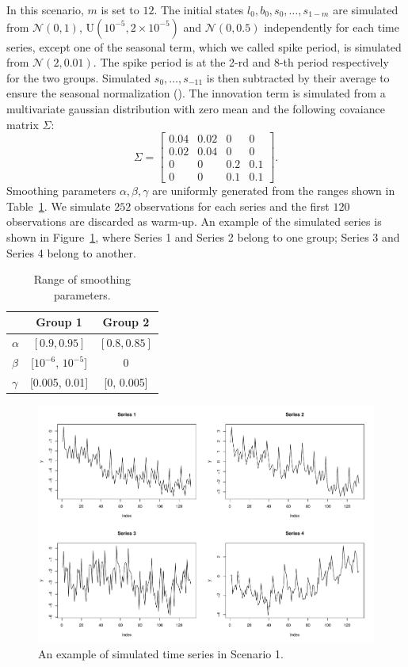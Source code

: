 \documentclass[11pt,a4paper]{article}
\begin{document}
In this scenario, $m$ is set to $12$. The initial states $l_0, b_0, s_0, \dots, s_{1-m}$ are simulated from $\mathcal{N}(0, 1)$, $\text{U}(10^{-5}, 2\times 10^{-5})$ and $\mathcal{N}(0, 0.5)$ independently for each time series, except one of the seasonal term, which we called spike period, is simulated from $\mathcal{N}(2, 0.01)$. 
The spike period is at the 2-rd and 8-th period respectively for the two groups.  Simulated $s_0,\dots,s_{-11}$ is then subtracted by their average to ensure the seasonal normalization (). 
The innovation term is simulated from a multivariate gaussian distribution with zero mean and the following covaiance matrix $\Sigma$:
\[
\Sigma = \left[\begin{matrix}
    0.04 & 0.02 & 0 & 0 \\
    0.02 & 0.04 & 0 & 0 \\
    0 & 0 & 0.2 & 0.1  \\
    0 & 0 & 0.1 & 0.1 
\end{matrix}\right].
\]
Smoothing parameters $\alpha, \beta, \gamma$ are uniformly generated from the ranges shown in Table~\ref{tab:sim1_range}.
We simulate $252$ observations for each series and the first $120$ observations are discarded as warm-up.
An example of the simulated series is shown in Figure~\ref{fig:sim1_example}, where Series 1 and Series 2 belong to one group; Series 3 and Series 4 belong to another.

\begin{table}[h]
\centering
\caption{\label{tab:sim1_range}Range of smoothing parameters.}
\begin{tabular}{lcc}
    \toprule
    & Group 1 & Group 2 \\
    \midrule
$\alpha$ & $[0.9, 0.95]$ & $[0.8, 0.85]$ \\
$\beta$ & [$10^{-6}$, $10^{-5}$] & 0 \\
$\gamma$ & [0.005, 0.01] & [0, 0.005] \\\bottomrule
\end{tabular}
\end{table}

\begin{figure}[h]
\centering
\includegraphics[width=\textwidth]{figures/sim1_example.pdf}
\caption{\label{fig:sim1_example} An example of simulated time series in Scenario 1.}
\end{figure}




\newpage



    
\end{document}
